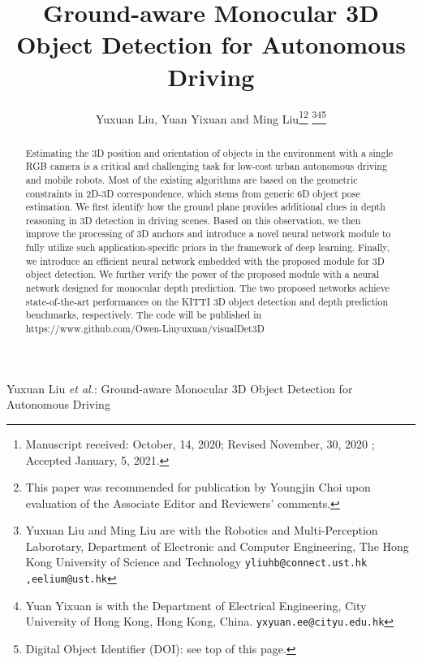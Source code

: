 \documentclass[letterpaper, 10 pt, journal, twoside]{IEEEtran}
\begin{document}
\title{Ground-aware Monocular 3D Object Detection for Autonomous Driving}

\author{Yuxuan Liu, Yuan Yixuan and Ming Liu\thanks{Manuscript received: October, 14, 2020; Revised November, 30, 2020 ; Accepted January, 5, 2021.}\thanks{This paper was recommended for publication by Youngjin Choi upon evaluation of the Associate Editor and Reviewers' comments.} \thanks{Yuxuan Liu and Ming Liu are with the Robotics and Multi-Perception Laborotary, 
Department of Electronic and Computer Engineering, The Hong Kong University of Science and Technology
        {\tt\footnotesize yliuhb@connect.ust.hk ,eelium@ust.hk}}\thanks{Yuan Yixuan is with the Department of Electrical Engineering, City University of Hong Kong, Hong Kong, China.
        {\tt\footnotesize yxyuan.ee@cityu.edu.hk}}\thanks{Digital Object Identifier (DOI): see top of this page.}
}



{Yuxuan Liu \MakeLowercase{\textit{et al.}}: Ground-aware Monocular 3D Object Detection for Autonomous Driving} 












\maketitle

\begin{abstract}
  Estimating the 3D position and orientation of objects in the environment with a single RGB camera is a critical and challenging task for low-cost urban autonomous driving and mobile robots.
  Most of the existing algorithms are based on the geometric constraints in 2D-3D correspondence, which stems from generic 6D object pose estimation.
  We first identify how the ground plane provides additional clues in depth reasoning in 3D detection in driving scenes.
  Based on this observation, we then improve the processing of 3D anchors and introduce a novel neural network module to fully utilize such application-specific priors in the framework of deep learning.
  Finally, we introduce an efficient neural network embedded with the proposed module for 3D object detection.
  We further verify the power of the proposed module with a neural network designed for monocular depth prediction. The two proposed networks achieve state-of-the-art performances on the KITTI 3D object detection and depth prediction benchmarks, respectively. The code will be published in https://www.github.com/Owen-Liuyuxuan/visualDet3D
\end{abstract}
\end{document}
